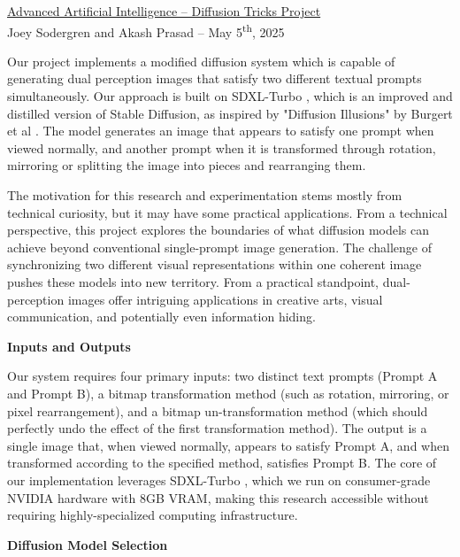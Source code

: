 \documentclass[12pt,letterpaper]{article}
\begin{document}
    \renewcommand{\headrulewidth}{0pt}
    \color{black}
    \setlength{\parskip}{12pt}

    \noindent
    \underline{\fontsize{16}{19.2}\selectfont{}Advanced Artificial Intelligence -- Diffusion Tricks Project}\\[4pt]
    Joey Sodergren and Akash Prasad -- May 5\textsuperscript{th}, 2025

    Our project implements a modified diffusion system which is capable of generating dual perception images that satisfy two different textual prompts simultaneously. Our approach is built on SDXL-Turbo \cite{sdxl_turbo}, which is an improved and distilled version of Stable Diffusion, as inspired by "Diffusion Illusions" by Burgert et al \cite{diffusion_illusions}. The model generates an image that appears to satisfy one prompt when viewed normally, and another prompt when it is transformed through rotation, mirroring or splitting the image into pieces and rearranging them.

    The motivation for this research and experimentation stems mostly from technical curiosity, but it may have some practical applications. From a technical perspective, this project explores the boundaries of what diffusion models can achieve beyond conventional single-prompt image generation. The challenge of synchronizing two different visual representations within one coherent image pushes these models into new territory. From a practical standpoint, dual-perception images offer intriguing applications in creative arts, visual communication, and potentially even information hiding.

    \noindent\textbf{Inputs and Outputs}\setlength{\parskip}{0pt}

    Our system requires four primary inputs: two distinct text prompts (Prompt A and Prompt B), a bitmap transformation method (such as rotation, mirroring, or pixel rearrangement), and a bitmap un-transformation method (which should perfectly undo the effect of the first transformation method). The output is a single image that, when viewed normally, appears to satisfy Prompt A, and when transformed according to the specified method, satisfies Prompt B. The core of our implementation leverages SDXL-Turbo \cite{sdxl_turbo}, which we run on consumer-grade NVIDIA hardware with 8GB VRAM, making this research accessible without requiring highly-specialized computing infrastructure.\setlength{\parskip}{12pt}

    \noindent\textbf{Diffusion Model Selection}\setlength{\parskip}{0pt}
\end{document}
